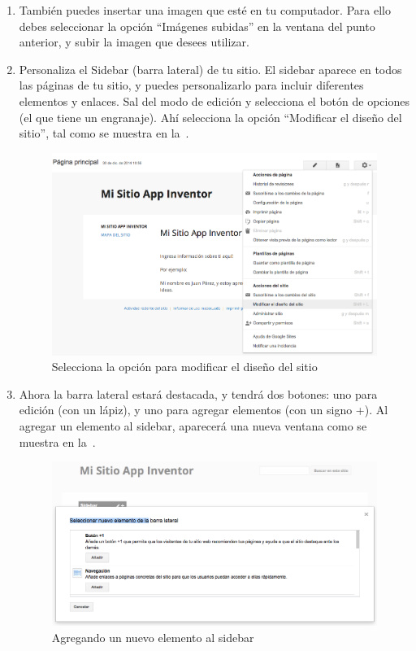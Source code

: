 \documentclass[letterpaper]{article}
\begin{document}
\begin{enumerate}
\item También puedes insertar una imagen que esté en tu
  computador. Para ello debes seleccionar la opción ``Imágenes
  subidas'' en la ventana del punto anterior, y subir la imagen que
  desees utilizar.

\item Personaliza el Sidebar (barra lateral) de tu sitio. El sidebar
  aparece en todos las páginas de tu sitio, y puedes personalizarlo
  para incluir diferentes elementos y enlaces. Sal del modo de edición
  y selecciona el botón de opciones (el que tiene un engranaje). Ahí
  selecciona la opción ``Modificar el diseño del sitio'', tal como se
  muestra en la~.

\begin{figure}[H]
\centering
\includegraphics[scale=0.25]{figures/SiteSidebar1}
\caption{Selecciona la opción para modificar el diseño del sitio}
\label{fig:SiteSidebar1}
\end{figure}

\item Ahora la barra lateral estará destacada, y tendrá dos botones:
  uno para edición (con un lápiz), y uno para agregar elementos (con
  un signo +). Al agregar un elemento al sidebar, aparecerá una nueva
  ventana como se muestra en la~.

\begin{figure}[H]
\centering
\includegraphics[scale=0.25]{figures/SiteSidebar2}
\caption{Agregando un nuevo elemento al sidebar}
\label{fig:SiteSidebar2}
\end{figure}


\end{enumerate}
\end{document}
